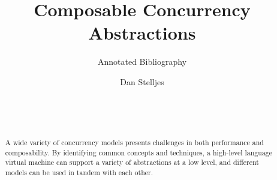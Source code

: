 \documentclass{sig-alternate}
\author{
\alignauthor{}
Dan Stelljes\\
  \affaddr{Division of Science and Mathematics}\\
  \affaddr{University of Minnesota, Morris}\\
  \affaddr{Morris, Minnesota, USA 56267}\\
  \email{stell124@morris.umn.edu}
}
\title{Composable Concurrency Abstractions}
\subtitle{Annotated Bibliography}
\begin{document}
\maketitle

\begin{abstract}
A wide variety of concurrency models presents challenges in both performance and composability. By identifying common concepts and techniques, a high-level language virtual machine can support a variety of abstractions at a low level, and different models can be used in tandem with each other.
\end{abstract}

\nocite{*}



\end{document}
